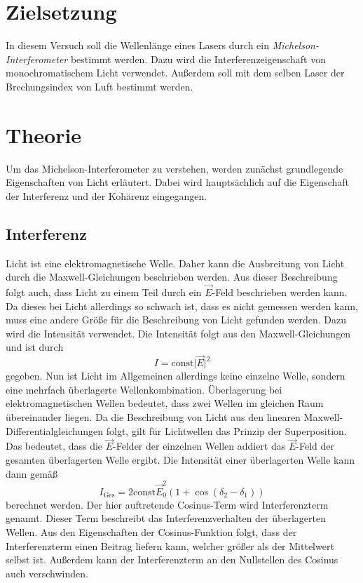 \section{Zielsetzung}
\label{sec:Ziel}
In diesem Versuch soll die Wellenlänge eines Lasers durch ein \textit{Michelson-Interferometer} bestimmt werden. Dazu wird die Interferenzeigenschaft von monochromatischem 
Licht verwendet. Außerdem soll mit dem selben Laser der Brechungsindex von Luft bestimmt werden.

\section{Theorie}
\label{sec:Theorie}
Um das Michelson-Interferometer zu verstehen, werden zunächst grundlegende Eigenschaften von Licht erläutert. Dabei wird hauptsächlich auf die Eigenschaft der Interferenz und
der Kohärenz eingegangen. 
\subsection{Interferenz}
\label{subsec:Interferenz}
Licht ist eine elektromagnetische Welle. Daher kann die Ausbreitung von Licht durch die Maxwell-Gleichungen beschrieben werden. Aus dieser Beschreibung folgt auch, dass Licht
zu einem Teil durch ein $\vec{E}$-Feld beschrieben werden kann. Da dieses bei Licht allerdings so schwach ist, dass es nicht gemessen werden kann, muss eine andere Größe für die
Beschreibung von Licht gefunden werden. Dazu wird die Intensität verwendet. Die Intensität folgt aus den Maxwell-Gleichungen und ist durch 
\begin{equation*}
    I = \text{const}\lvert \vec{E} \rvert^2
\end{equation*}
gegeben. 
Nun ist Licht im Allgemeinen allerdings keine einzelne Welle, sondern eine mehrfach überlagerte Wellenkombination. Überlagerung bei elektromagnetischen Wellen bedeutet, dass 
zwei Wellen im gleichen Raum übereinander liegen. Da die Beschreibung von Licht aus den linearen Maxwell-Differentialgleichungen folgt, gilt für Lichtwellen das Prinzip der
Superposition. Das bedeutet, dass die $\vec{E}$-Felder der einzelnen Wellen addiert das $\vec{E}$-Feld der gesamten überlagerten Welle ergibt. Die Intensität einer 
überlagerten Welle kann dann gemäß 
\begin{equation}
    I_\text{Ges} = 2 \text{const}\vec{E}_0^2(1 + \cos(\delta_2 - \delta_1))
\end{equation}
berechnet werden. Der hier auftretende Cosinus-Term wird Interferenzterm genannt. Dieser Term beschreibt das Interferenzverhalten der überlagerten Wellen. Aus den Eigenschaften
der Cosinus-Funktion folgt, dass der Interferenzterm einen Beitrag liefern kann, welcher größer als der Mittelwert selbst ist. Außerdem kann der Interferenzterm an den 
Nullstellen des Cosinus auch verschwinden. 

